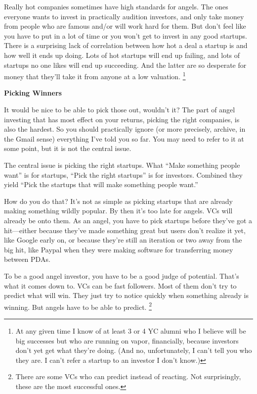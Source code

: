 Really hot companies sometimes have high standards for angels. The ones
everyone wants to invest in practically audition investors, and only
take money from people who are famous and/or will work hard for them.
But don't feel like you have to put in a lot of time or you won't get to
invest in any good startups. There is a surprising lack of correlation
between how hot a deal a startup is and how well it ends up doing. Lots
of hot startups will end up failing, and lots of startups no one likes
will end up succeeding. And the latter are so desperate for money that
they'll take it from anyone at a low valuation. \footnote{At any given time I know of at least 3 or 4 YC alumni who I
believe will be big successes but who are running on vapor, financially,
because investors don't yet get what they're doing. (And no,
unfortunately, I can't tell you who they are. I can't refer a startup to
an investor I don't know.)}

\textbf{Picking Winners}

It would be nice to be able to pick those out, wouldn't it? The part of
angel investing that has most effect on your returns, picking the right
companies, is also the hardest. So you should practically ignore (or
more precisely, archive, in the Gmail sense) everything I've told you so
far. You may need to refer to it at some point, but it is not the
central issue.

The central issue is picking the right startups. What ``Make something
people want'' is for startups, ``Pick the right startups'' is for
investors. Combined they yield ``Pick the startups that will make
something people want.''

How do you do that? It's not as simple as picking startups that are
already making something wildly popular. By then it's too late for
angels. VCs will already be onto them. As an angel, you have to pick
startups before they've got a hit---either because they've made
something great but users don't realize it yet, like Google early on, or
because they're still an iteration or two away from the big hit, like
Paypal when they were making software for transferring money between
PDAs.

To be a good angel investor, you have to be a good judge of potential.
That's what it comes down to. VCs can be fast followers. Most of them
don't try to predict what will win. They just try to notice quickly when
something already is winning. But angels have to be able to predict.
\footnote{There are some VCs who can predict instead of reacting. Not
surprisingly, these are the most successful ones.}

